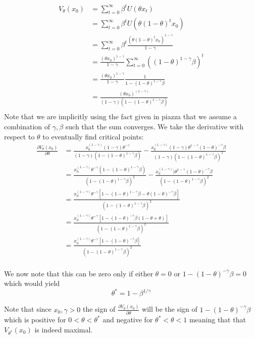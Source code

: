 \documentclass{article}[12pt]
\begin{document}
\begin{align*}
V_\theta(x_0) &= \sum_{t=0}^{\infty} \beta^t U(\theta x_t)\\
&= \sum_{t=0}^{\infty} \beta^t U(\theta (1-\theta)^t x_0)\\
&= \sum_{t=0}^{\infty} \beta^t \frac{(\theta (1-\theta)^t x_0)^{1-\gamma}}{1-\gamma}\\
&= \frac{(\theta x_0)^{1-\gamma}}{1-\gamma}\sum_{t=0}^{\infty}  ((1-\theta)^{1-\gamma}\beta)^t \\
&= \frac{(\theta x_0)^{1-\gamma}}{1-\gamma}\frac{1}{1-(1-\theta)^{1-\gamma}\beta} \\
&= \frac{(\theta x_0)^{(1-\gamma)}}{(1-\gamma)(1-(1-\theta)^{1-\gamma}\beta)} \\
\end{align*}
Note that we are implicitly using the fact given in piazza that we assume a combination of $\gamma, \beta$ such that the sum converges.
We take the derivative with respect to $\theta$ to eventually find critical points:
\begin{align*}
\frac{\partial V_\theta (x_0)}{\partial \theta} &= \frac{x_0^{(1-\gamma)}(1-\gamma)\theta^{-\gamma}}{(1-\gamma)(1-(1-\theta)^{1-\gamma}\beta)}- \frac{x_0^{(1-\gamma)}(1-\gamma)\theta^{1-\gamma}(1-\theta)^{-\gamma}\beta}{(1-\gamma)(1-(1-\theta)^{1-\gamma}\beta)^2} \\
&= \frac{x_0^{(1-\gamma)}\theta^{-\gamma}(1-(1-\theta)^{1-\gamma}\beta)}{(1-(1-\theta)^{1-\gamma}\beta)^2}- \frac{x_0^{(1-\gamma)})\theta^{1-\gamma}(1-\theta)^{-\gamma}\beta}{(1-(1-\theta)^{1-\gamma}\beta)^2} \\
&= \frac{x_0^{(1-\gamma)}\theta^{-\gamma}[1-(1-\theta)^{1-\gamma}\beta - \theta (1-\theta)^{-\gamma}\beta]}{(1-(1-\theta)^{1-\gamma}\beta)^2} \\
&= \frac{x_0^{(1-\gamma)}\theta^{-\gamma}[1-(1-\theta)^{-\gamma}\beta(1-\theta + \theta)]}{(1-(1-\theta)^{1-\gamma}\beta)^2} \\
&= \frac{x_0^{(1-\gamma)}\theta^{-\gamma}[1-(1-\theta)^{-\gamma}\beta]}{(1-(1-\theta)^{1-\gamma}\beta)^2} \\
\end{align*}

We now note that this can be zero only if either $\theta = 0$ or $1-(1-\theta)^{-\gamma}\beta =0$ which would yield $$\theta^* =1 - \beta^{1/\gamma}$$

Note that since $x_0, \gamma > 0$ the sign of $\frac{\partial V_\theta (x_0)}{\partial \theta}$ will be the sign of $1-(1-\theta)^{-\gamma}\beta$ which is positive for $0<\theta < \theta^*$ and negative for $\theta^*<\theta < 1$ meaning that that $V_{\theta^*}(x_0)$ is indeed maximal. 
\end{document}
